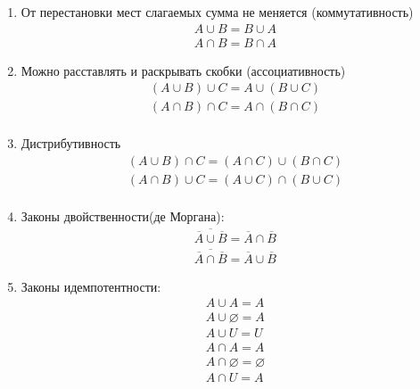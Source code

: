 \documentclass[12pt, a4paper]{article}
\begin{document}
\begin{enumerate}
    \item От перестановки мест слагаемых сумма не меняется (коммутативность)
    \begin{equation}
        \begin{aligned}
            A \cup B = B \cup A \\
            A \cap B = B \cap A
        \end{aligned}
    \end{equation}
    
    \item Можно расставлять и раскрывать скобки (ассоциативность) 
    \begin{equation}
        \begin{aligned}
           (A \cup B) \cup C = A \cup (B \cup C) \\
           (A \cap B) \cap C = A \cap (B \cap C) \\
        \end{aligned}
    \end{equation}
    
    \item Дистрибутивность 
    \begin{equation}
        \begin{aligned}
           (A \cup B) \cap C = (A \cap C) \cup (B \cap C) \\
           (A \cap B) \cup C = (A \cup C) \cap (B \cup C) \\
        \end{aligned}
    \end{equation}    
    
    \item Законы двойственности(де Моргана):
    \begin{equation}
        \begin{aligned}
            \overline{\overline{A} \cup \overline{B}} = \overline{A} \cap \overline{B}  \\
            \overline{\overline{A} \cap \overline{B}} = \overline{A} \cup \overline{B} 
        \end{aligned}
    \end{equation}       

    \item Законы идемпотентности:
    \begin{equation}
        \begin{aligned}
            A \cup A = A \\
            A \cup \varnothing = A \\
            A \cup U = U \\
            A \cap A = A \\
            A \cap \varnothing = \varnothing \\
            A \cap U = A         
        \end{aligned}
    \end{equation}    
    

\end{enumerate}
\end{document}
